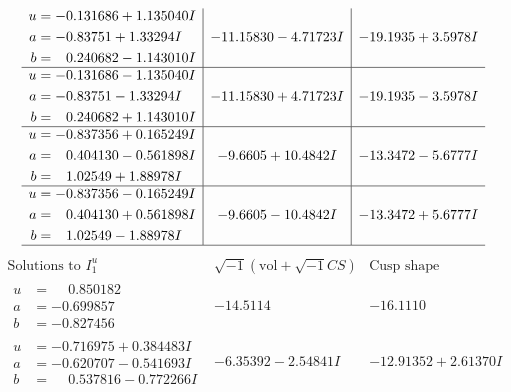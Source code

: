 \documentclass[1p]{elsarticle_modified}
\theoremstyle{definition}
\newcommand{\I}{\sqrt{-1}}
\begin{document}
$$\begin{array}{c|c|c}
\begin{aligned}
u &= -0.131686 + 1.135040 I \\
a &= -0.83751 + 1.33294 I \\
b &= \phantom{-}0.240682 - 1.143010 I\end{aligned}
 & -11.15830 - 4.71723 I & -19.1935 + 3.5978 I \\ \hline\begin{aligned}
u &= -0.131686 - 1.135040 I \\
a &= -0.83751 - 1.33294 I \\
b &= \phantom{-}0.240682 + 1.143010 I\end{aligned}
 & -11.15830 + 4.71723 I & -19.1935 - 3.5978 I \\ \hline\begin{aligned}
u &= -0.837356 + 0.165249 I \\
a &= \phantom{-}0.404130 - 0.561898 I \\
b &= \phantom{-}1.02549 + 1.88978 I\end{aligned}
 & -9.6605 + 10.4842 I & -13.3472 - 5.6777 I \\ \hline\begin{aligned}
u &= -0.837356 - 0.165249 I \\
a &= \phantom{-}0.404130 + 0.561898 I \\
b &= \phantom{-}1.02549 - 1.88978 I\end{aligned}
 & -9.6605 - 10.4842 I & -13.3472 + 5.6777 I\\
 \hline 
 \end{array}$$\newpage$$\begin{array}{c|c|c}  
\text{Solutions to }I^u_{1}& \I (\text{vol} + \sqrt{-1}CS) & \text{Cusp shape}\\
 \hline 
\begin{aligned}
u &= \phantom{-}0.850182\phantom{ +0.000000I} \\
a &= -0.699857\phantom{ +0.000000I} \\
b &= -0.827456\phantom{ +0.000000I}\end{aligned}
 & -14.5114\phantom{ +0.000000I} & -16.1110\phantom{ +0.000000I} \\ \hline\begin{aligned}
u &= -0.716975 + 0.384483 I \\
a &= -0.620707 - 0.541693 I \\
b &= \phantom{-}0.537816 - 0.772266 I\end{aligned}
 & -6.35392 - 2.54841 I & -12.91352 + 2.61370 I \\ \hline\begin{aligned}

\end{aligned}
\end{array}$$
\end{document}
